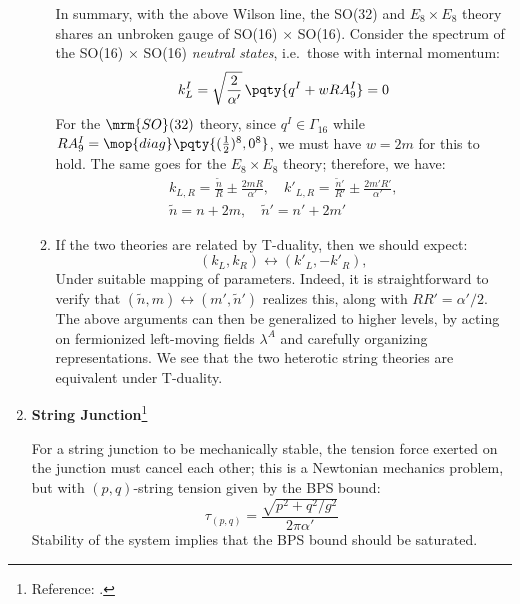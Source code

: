 \documentclass[a4paper,10pt]{article}
\begin{document}
\begin{enumerate}
\begin{enumerate}
	In summary, with the above Wilson line, the SO(32) and $E_8 \times E_8$ theory shares an unbroken gauge of SO(16) × SO(16). Consider the spectrum of the SO(16) × SO(16) \textit{neutral states}, i.e.\ those with internal momentum:
	\begin{equation}
		k^I_L
		= \sqrt{\frac{2}{\alpha'}}\,
			\pqty{
				q^I + w R A^I_9
			}
		= 0
	\end{equation}
	For the $\mrm{SO}(32)$ theory, since $q^I \in \Gamma_{16}$
	while $
		RA^I_9
		= \mop{diag} \pqty{
				(\tfrac{1}{2})^8,
				0^8
			}
	$, we must have $w = 2m$ for this to hold. The same goes for the $E_8 \times E_8$ theory;
	therefore, we have:
	\begin{gather}
		k_{L,R} = \frac{\tilde{n}}{R}
			\pm \frac{2mR}{\alpha'},
	\quad
		k'_{L,R} = \frac{\tilde{n}'}{R'}
			\pm \frac{2m'R'}{\alpha'},
	\\
		\tilde{n} = n + 2m,\quad
		\tilde{n}' = n' + 2m'
	\end{gather}
	
	\item If the two theories are related by T-duality, then we should expect:
	\begin{equation}
		(k_L, k_R) \longleftrightarrow (k'_L, −k'_R),
	\end{equation}
	Under suitable mapping of parameters. Indeed, it is straightforward to verify that $
		(\tilde{n},m)\leftrightarrow (m',\tilde{n}')
	$ realizes this, along with $
		RR' = \alpha'/2
	$. The above arguments can then be generalized to higher levels, by acting on fermionized left-moving fields $\lambda^A$ and carefully organizing representations. We see that the two heterotic string theories are equivalent under T-duality.
	\end{enumerate}

\item \textbf{String Junction}\footnote{
		Reference: . 
	}
	
	\nopagebreak
	For a string junction to be mechanically stable, the tension force exerted on the junction must cancel each other; this is a Newtonian mechanics problem, but with $(p,q)$-string tension given by the BPS bound:
	\begin{equation}
		\tau_{(p,q)}
		= \frac{\sqrt{p^2 + q^2/g^2}}{2\pi\alpha'}
	\end{equation}
	Stability of the system implies that the BPS bound should be saturated. 
	

\end{enumerate}
\end{document}
